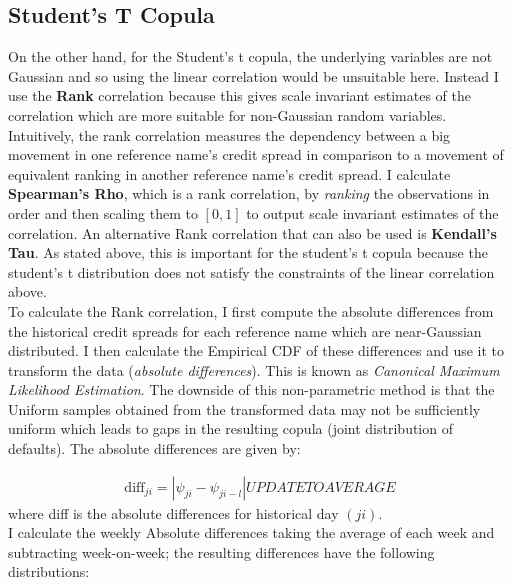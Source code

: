 \documentclass{report}
\theoremstyle{plain}
\theoremstyle{definition}
\begin{document}
\subsection{Student's T Copula}

On the other hand, for the Student's t copula, the underlying variables are not Gaussian and so using the linear correlation would be unsuitable here. Instead I use the \textbf{Rank} correlation because this gives scale invariant estimates of the correlation which are more suitable for non-Gaussian random variables. Intuitively, the rank correlation measures the dependency between a big movement in one reference name's credit spread in comparison to a movement of equivalent ranking in another reference name's credit spread. I calculate \textbf{Spearman's Rho}, which is a rank correlation, by \emph{ranking} the observations in order and then scaling them to $[0,1]$ to output scale invariant estimates of the correlation. An alternative Rank correlation that can also be used is \textbf{Kendall's Tau}. As stated above, this is important for the student's t copula because the student's t distribution does not satisfy the constraints of the linear correlation above. \\

To calculate the Rank correlation, I first compute the absolute differences from the historical credit spreads for each reference name which are near-Gaussian distributed. I then calculate the Empirical CDF of these differences and use it to transform the data (\textit{absolute differences}). This is known as \emph{Canonical Maximum Likelihood Estimation}. The downside of this non-parametric method is that the Uniform samples obtained from the transformed data may not be sufficiently uniform which leads to gaps in the resulting copula (joint distribution of defaults). The absolute differences are given by:

\begin{align*}
\text{diff}_{ji} = |\psi_{ji} - \psi_{ji - l}| UPDATE TO AVERAGE
\end{align*}
where diff is the absolute differences for historical day $(ji)$.\\

I calculate the weekly Absolute differences taking the average of each week and subtracting week-on-week; the resulting differences have the following distributions:
\end{document}
